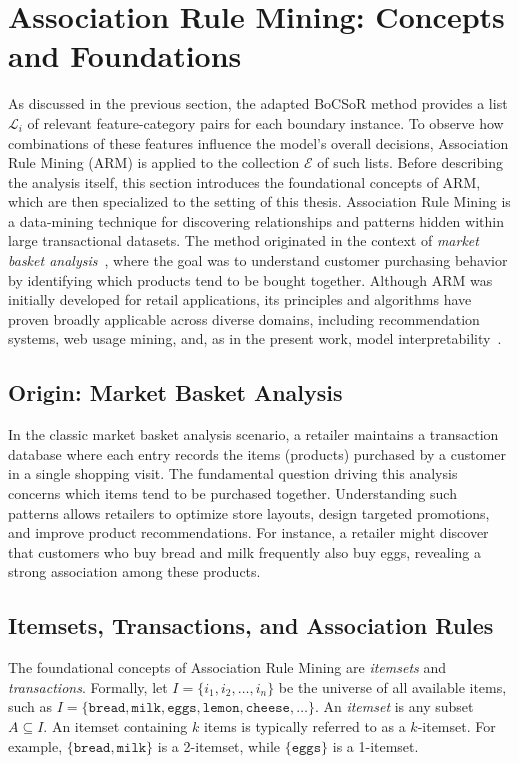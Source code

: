 \section{Association Rule Mining: Concepts and Foundations}
\label{sec:arm-foundations}

As discussed in the previous section, the adapted BoCSoR method provides a list $\mathcal{L}_i$ of relevant feature-category pairs for each boundary instance. To observe how combinations of these features influence the model's overall decisions, Association Rule Mining (ARM) is applied to the collection $\mathcal{E}$ of such lists. Before describing the analysis itself, this section introduces the foundational concepts of ARM, which are then specialized to the setting of this thesis.
Association Rule Mining is a data-mining technique for discovering relationships and patterns hidden within large transactional datasets. The method originated in the context of \emph{market basket analysis}~\cite{agrawal1994fast}, where the goal was to understand customer purchasing behavior by identifying which products tend to be bought together. Although ARM was initially developed for retail applications, its principles and algorithms have proven broadly applicable across diverse domains, including recommendation systems, web usage mining, and, as in the present work, model interpretability~\cite{han2000mining}.

\subsection{Origin: Market Basket Analysis}

In the classic market basket analysis scenario, a retailer maintains a transaction database where each entry records the items (products) purchased by a customer in a single shopping visit. The fundamental question driving this analysis concerns which items tend to be purchased together. Understanding such patterns allows retailers to optimize store layouts, design targeted promotions, and improve product recommendations. For instance, a retailer might discover that customers who buy bread and milk frequently also buy eggs, revealing a strong association among these products.

\subsection{Itemsets, Transactions, and Association Rules}

The foundational concepts of Association Rule Mining are \emph{itemsets} and \emph{transactions}. Formally, let $I = \{i_1, i_2, \dots, i_n\}$ be the universe of all available items, such as $I = \{\texttt{bread}, \texttt{milk}, \texttt{eggs}, \texttt{lemon}, \texttt{cheese}, \dots\}$. An \emph{itemset} is any subset $A \subseteq I$. An itemset containing $k$ items is typically referred to as a $k$-itemset. For example, $\{\texttt{bread}, \texttt{milk}\}$ is a 2-itemset, while $\{\texttt{eggs}\}$ is a 1-itemset.

